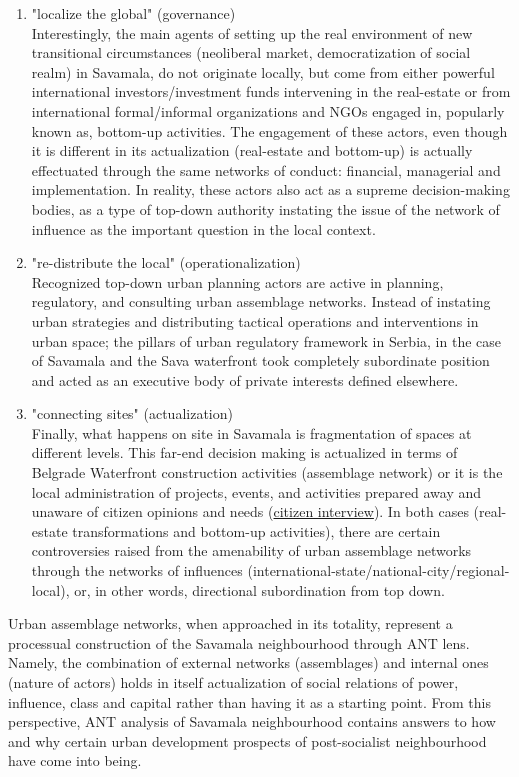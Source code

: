 \documentclass[11pt]{report}
\begin{document}
\begin{enumerate}
\item "localize the global" (governance)
\\
Interestingly, the main agents of setting up the real environment of new transitional circumstances (neoliberal market, democratization of social realm) in Savamala, do not originate locally, but come from either powerful international investors/investment funds intervening in the real-estate or from international formal/informal organizations and NGOs engaged in, popularly known as, bottom-up activities.
The engagement of these actors, even though it is different in its actualization (real-estate and bottom-up) is actually effectuated through the same networks of conduct: financial, managerial and implementation.
In reality, these actors also act as a supreme decision-making bodies, as a type of top-down authority instating the issue of the network of influence as the important question in  the local context. 

\item "re-distribute the local" (operationalization)
\\
Recognized top-down urban planning actors are active in planning, regulatory, and consulting urban assemblage networks.
Instead of instating urban strategies and distributing tactical operations and interventions in urban space; the pillars of urban regulatory framework in Serbia, in the case of Savamala and the Sava waterfront took completely subordinate position and acted as an executive body of private interests defined elsewhere.

\item "connecting sites" (actualization)
\\
Finally, what happens on site in Savamala is fragmentation of spaces at different levels.
This far-end decision making is actualized in terms of Belgrade Waterfront construction activities (assemblage network) or it is the local administration of projects, events, and activities prepared away and unaware of citizen opinions and needs (\href{}{citizen interview}).
In both cases (real-estate transformations and bottom-up activities), there are certain controversies raised from the amenability of urban assemblage networks through the networks of influences (international-state/national-city/regional-local), or, in other words, directional subordination from top down.
\end{enumerate}

Urban assemblage networks, when approached in its totality, represent a processual construction of the Savamala neighbourhood through ANT lens.
Namely, the combination of external networks (assemblages) and internal ones (nature of actors) holds in itself actualization of social relations of power, influence, class and capital rather than having it as a starting point.
From this perspective, ANT analysis of Savamala neighbourhood contains answers to how and why certain urban development prospects of post-socialist neighbourhood have come into being.
\end{document}
